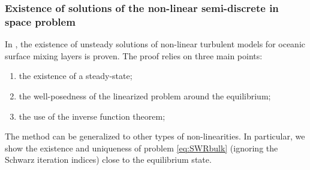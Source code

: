 \subsubsection{Existence of solutions of the
non-linear semi-discrete in space problem}
In \citep{chacon-rebollo_existence_2014},
the existence of unsteady solutions of
non-linear turbulent models for oceanic surface mixing layers is
proven.
The proof relies on three main points:
\begin{enumerate}
	\item the existence of a steady-state;
	\item the well-posedness of the linearized problem
	around the equilibrium;
	\item the use of the inverse function theorem;
\end{enumerate}
The method can be generalized to other types of
non-linearities. In particular, we show the existence and
uniqueness of problem \eqref{eq:SWRbulk}
(ignoring the Schwarz iteration indices) close to the
equilibrium state.
